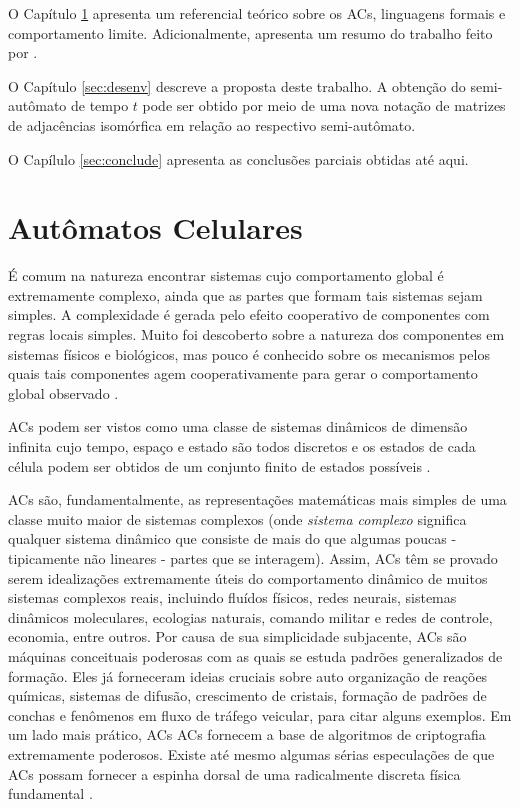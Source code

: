 \documentclass[12pt,a4paper]{article}
\begin{document}
O Capítulo \ref{sec:refteo} apresenta um referencial teórico sobre 
os ACs, linguagens formais e comportamento limite.
Adicionalmente, apresenta um resumo do trabalho feito por
.

O Capítulo \ref{sec:desenv} descreve a proposta deste trabalho. A obtenção do
semi-autômato de tempo $t$ pode ser obtido por meio de uma nova notação de 
matrizes de adjacências isomórfica em relação ao respectivo semi-autômato.

O Capílulo \ref{sec:conclude} apresenta as conclusões parciais obtidas até
aqui.

\newpage

\section{Autômatos Celulares}\label{sec:refteo}

É comum na natureza encontrar sistemas cujo comportamento global é extremamente
complexo, ainda que as partes que formam tais sistemas sejam simples. A
complexidade é gerada pelo efeito cooperativo de componentes com regras locais
simples. Muito foi descoberto sobre a natureza dos componentes em sistemas físicos
e biológicos, mas pouco é conhecido sobre os mecanismos pelos quais tais componentes
agem cooperativamente para gerar o comportamento global observado .

ACs podem ser vistos como uma classe de sistemas dinâmicos de dimensão
infinita cujo tempo, espaço e estado são todos discretos e os estados de cada célula
podem ser obtidos de um conjunto finito de estados possíveis . 

ACs são, fundamentalmente, as representações matemáticas mais simples
de uma classe muito maior de sistemas complexos (onde \textit{sistema complexo} significa
qualquer sistema dinâmico que consiste de mais do que algumas poucas - tipicamente
não lineares - partes que se interagem). Assim, ACs têm se provado
serem idealizações extremamente úteis do comportamento dinâmico de muitos sistemas
complexos reais, incluindo fluídos físicos, redes neurais, sistemas dinâmicos
moleculares, ecologias naturais, comando militar e redes de controle, economia, entre
outros. Por causa de sua simplicidade subjacente, ACs são máquinas
conceituais poderosas com as quais se estuda padrões generalizados de formação. Eles
já forneceram ideias cruciais sobre auto organização de reações químicas, sistemas de
difusão, crescimento de cristais, formação de padrões de conchas e fenômenos em fluxo
de tráfego veicular, para citar alguns exemplos. Em um lado mais prático, ACs
ACs fornecem a base de algoritmos de criptografia extremamente poderosos. Existe
até mesmo algumas sérias especulações de que ACs possam fornecer
a espinha dorsal de uma radicalmente discreta física fundamental .
\end{document}

